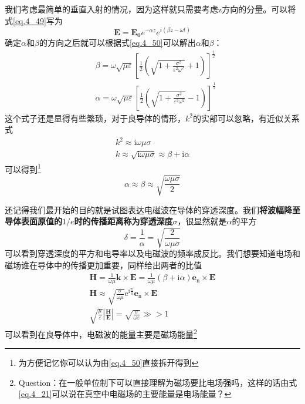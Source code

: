         我们考虑最简单的垂直入射的情况，因为这样就只需要考虑z方向的分量。可以将式\ref{eq.4_49}写为\[\boldsymbol{E} =\boldsymbol{E_0} e^{- \alpha z} e^{i(\beta z - \omega t)}\]确定$\alpha$和$\beta$的方向之后就可以根据式\ref{eq.4_50}可以解出$\alpha$和$\beta$：
        \begin{equation}
            \begin{aligned}
            &\beta=\omega \sqrt{\mu \varepsilon}\left[\frac{1}{2}\left(\sqrt{1+\frac{\sigma^{2}}{\varepsilon^{2} \omega^{2}}}+1\right)\right]^{\frac{1}{2}} \\
            &\alpha=\omega \sqrt{\mu \varepsilon}\left[\frac{1}{2}\left(\sqrt{1+\frac{\sigma^{2}}{\varepsilon^{2} \omega^{2}}}-1\right)\right]^{\frac{1}{2}}
            \end{aligned}
            \end{equation}
        这个式子还是显得有些繁琐，对于良导体的情形，$k^2$的实部可以忽略，有近似关系式
        \begin{equation}
            \begin{gathered}
            k^{2} \approx \mathrm{i} \omega \mu \sigma \\
            k \approx \sqrt{\mathrm{i} \omega \mu \sigma} \approx \beta+\mathrm{i} \alpha
            \end{gathered}
        \end{equation}
        可以得到\footnote{为方便记忆你可以认为由\ref{eq.4_50}直接拆开得到}
        \begin{equation}
            \alpha \approx \beta \approx \sqrt{\frac{\omega \mu \sigma}{2}}
        \end{equation}

        还记得我们最开始的目的就是试图表达电磁波在导体的穿透深度。我们\textbf{将波幅降至导体表面原值的$1/e$时的传播距离称为穿透深度$\sigma$}，很显然就是$\alpha$的平方
        \begin{equation}
            \boxed{\delta = \frac{1}{\alpha} = \sqrt{\frac{2}{\omega \mu \sigma}}}
        \end{equation}
        可以看到穿透深度的平方和电导率以及电磁波的频率成反比。我们想要知道电场和磁场谁在导体中的传播更加重要，同样给出两者的比值
        \begin{equation}
            \label{eq.4_55}
            \begin{gathered}
                \boldsymbol{H}=\frac{1}{\omega \mu} \boldsymbol{k} \times \boldsymbol{E}=\frac{1}{\omega \mu}(\beta+\mathrm{i} \alpha) \boldsymbol{e}_{\mathrm{n}} \times \boldsymbol{E} \\
                \boldsymbol{H} \approx \sqrt{\frac{\sigma}{\omega \mu}} \mathrm{e}^{\mathrm{i} \frac{\mathrm{\pi}}{4}} \boldsymbol{e}_{\mathrm{n}} \times \boldsymbol{E} \\
                \sqrt{\frac{\mu}{\varepsilon}}\left|\frac{\boldsymbol{H}}{\boldsymbol{E}}\right|=\sqrt{\frac{\sigma}{\omega \varepsilon}} \gg>1
            \end{gathered}
        \end{equation}
        可以看到在良导体中，电磁波的能量主要是磁场能量\footnote{\textcolor[RGB]{143,143,143}{Question：在一般单位制下可以直接理解为磁场要比电场强吗，这样的话由式\ref{eq.4_21}可以说在真空中电磁场的主要能量是电场能量？}}
